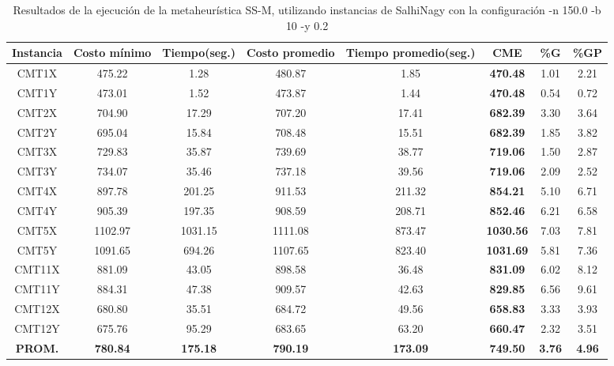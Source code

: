 \begin{table}[h]
\caption{Resultados de la ejecución de la metaheurística SS-M, utilizando instancias de SalhiNagy con la configuración -n 150.0 -b 10 -y 0.2}
\centering
\small
\begin{tabular}{c c c c c c c c}
\hline\hline
Instancia & Costo mínimo & Tiempo(seg.) & Costo promedio & Tiempo promedio(seg.) & CME & \%G & \%GP \\ [0.5ex]
\hline
CMT1X & 475.22 & 1.28 & 
480.87 & 1.85 & \bf{470.48} & 
1.01 & 2.21\\CMT1Y & 473.01 & 1.52 & 
473.87 & 1.44 & \bf{470.48} & 
0.54 & 0.72\\CMT2X & 704.90 & 17.29 & 
707.20 & 17.41 & \bf{682.39} & 
3.30 & 3.64\\CMT2Y & 695.04 & 15.84 & 
708.48 & 15.51 & \bf{682.39} & 
1.85 & 3.82\\CMT3X & 729.83 & 35.87 & 
739.69 & 38.77 & \bf{719.06} & 
1.50 & 2.87\\CMT3Y & 734.07 & 35.46 & 
737.18 & 39.56 & \bf{719.06} & 
2.09 & 2.52\\CMT4X & 897.78 & 201.25 & 
911.53 & 211.32 & \bf{854.21} & 
5.10 & 6.71\\CMT4Y & 905.39 & 197.35 & 
908.59 & 208.71 & \bf{852.46} & 
6.21 & 6.58\\CMT5X & 1102.97 & 1031.15 & 
1111.08 & 873.47 & \bf{1030.56} & 
7.03 & 7.81\\CMT5Y & 1091.65 & 694.26 & 
1107.65 & 823.40 & \bf{1031.69} & 
5.81 & 7.36\\CMT11X & 881.09 & 43.05 & 
898.58 & 36.48 & \bf{831.09} & 
6.02 & 8.12\\CMT11Y & 884.31 & 47.38 & 
909.57 & 42.63 & \bf{829.85} & 
6.56 & 9.61\\CMT12X & 680.80 & 35.51 & 
684.72 & 49.56 & \bf{658.83} & 
3.33 & 3.93\\CMT12Y & 675.76 & 95.29 & 
683.65 & 63.20 & \bf{660.47} & 
2.32 & 3.51\\\bf{PROM.} & 
\bf{780.84} & \bf{175.18} & \bf{790.19} & \bf{173.09} & \bf{749.50} & \bf{3.76} & \bf{4.96}\\[1ex]\hline
\end{tabular}
\label{table:SS-M-150-0.2-S}
\end{table}

